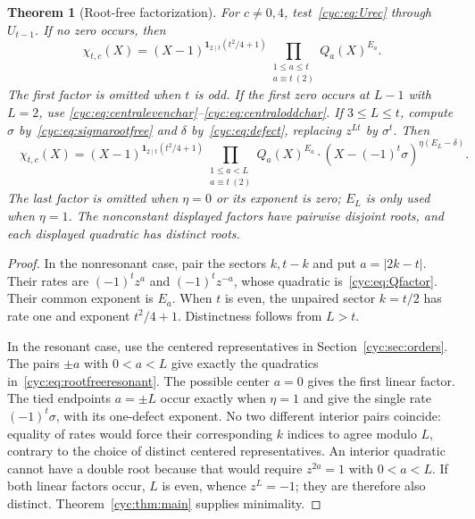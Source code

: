 \documentclass[11pt,a4paper]{article}
\numberwithin{equation}{section}
\newtheorem{theorem}{Theorem}[section]
\theoremstyle{definition}
\theoremstyle{remark}
\newcommand{\ind}{\mathbf 1}
\begin{document}
\begin{theorem}[Root-free factorization]\label{cyc:thm:rootfree}
For $c\ne0,4$, test~\eqref{cyc:eq:Urec} through $U_{t-1}$.
If no zero occurs, then
\begin{equation}\label{cyc:eq:rootfreegeneric}
 \chi_{t,c}(X)=
 (X-1)^{\ind_{2\mid t}(t^2/4+1)}
 \prod_{\substack{1\le a\le t\\a\equiv t\ (2)}}Q_a(X)^{E_a}.
\end{equation}
The first factor is omitted when $t$ is odd.
If the first zero occurs at $L-1$ with $L=2$, use
\eqref{cyc:eq:centralevenchar}--\eqref{cyc:eq:centraloddchar}.
If $3\le L\le t$, compute $\sigma$ by~\eqref{cyc:eq:sigmarootfree} and
$\delta$ by~\eqref{cyc:eq:defect}, replacing $z^{Lt}$ by $\sigma^t$.
Then
\begin{equation}\label{cyc:eq:rootfreeresonant}
 \boxed{\quad
 \chi_{t,c}(X)=
 (X-1)^{\ind_{2\mid t}(t^2/4+1)}
 \prod_{\substack{1\le a<L\\a\equiv t\ (2)}}Q_a(X)^{E_a}
 \cdot (X-(-1)^t\sigma)^{\eta(E_L-\delta)}.
 \quad}
\end{equation}
The last factor is omitted when $\eta=0$ or its exponent is zero;
$E_L$ is only used when $\eta=1$.
The nonconstant displayed factors have pairwise disjoint roots, and
each displayed quadratic has distinct roots.
\end{theorem}
\begin{proof}
In the nonresonant case, pair the sectors $k,t-k$ and put
$a=|2k-t|$.  Their rates are $(-1)^tz^a$ and $(-1)^tz^{-a}$,
whose quadratic is~\eqref{cyc:eq:Qfactor}.  Their common exponent is $E_a$.
When $t$ is even, the unpaired sector $k=t/2$ has rate one and
exponent $t^2/4+1$.  Distinctness follows from $L>t$.

In the resonant case, use the centered representatives in
Section~\ref{cyc:sec:orders}.  The pairs $\pm a$ with $0<a<L$ give
exactly the quadratics in~\eqref{cyc:eq:rootfreeresonant}.  The possible
center $a=0$ gives the first linear factor.  The tied endpoints
$a=\pm L$ occur exactly when $\eta=1$ and give the single rate
$(-1)^t\sigma$, with its one-defect exponent.
No two different interior pairs coincide: equality of rates would
force their corresponding $k$ indices to agree modulo $L$, contrary
to the choice of distinct centered representatives.  An interior
quadratic cannot have a double root because that would require
$z^{2a}=1$ with $0<a<L$.
If both linear factors occur, $L$ is even, whence $z^L=-1$; they are
therefore also distinct.  Theorem~\ref{cyc:thm:main} supplies minimality.
\end{proof}
\end{document}
